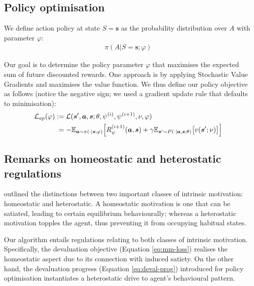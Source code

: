 \documentclass[utf8]{frontiersSCNS}
\newcommand{\bs}{\boldsymbol}
\begin{document}
\subsection{Policy optimisation} \label{subsec:policy}

We define action policy at state $S=\bs{s}$ as the probability distribution over $A$ with parameter $\varphi$:
%
	\begin{equation}
	\begin{aligned} \label{eq:policy}
	\pi(A|S=\bs{s}; \varphi)
	\end{aligned}
	\end{equation}

Our goal is to determine the policy parameter $\varphi$ that maximises the expected sum of future discounted rewards. One approach is by applying Stochastic Value Gradients \citep{svg} and maximises the value function. We thus define our policy objective as follows (notice the negative sign; we used a gradient update rule that defaults to minimisation):
%
	\begin{equation}
	\begin{aligned} \label{eq:policy-loss}
	\mathcal{L}_{ap}(\varphi) 
		&:=
		\mathcal{L}(\bs{s}^\prime, \bs{a}, \bs{s}; \theta, \psi^{(i)}, \psi^{(i+1)}, \nu, \varphi) \\
		&\phantom{:}= - 
		\mathbb{E}_{\bs{a} \sim \pi(\cdot | \bs{s}; \varphi)} 
		\Bigl[ 
		R_\psi^{(i+1)}(\bs{a}, \bs{s}) + \gamma 
		\mathbb{E}_{\bs{s}^\prime \sim P(\cdot |\bs{a}, \bs{s}; \theta)}
		\bigl[ v(\bs{s}^\prime; \nu) \bigr] 
		\Bigr] \\
	\end{aligned}
	\end{equation}

\subsection{Remarks on homeostatic and heterostatic regulations} \label{subsec:homeohetero}

\citet{intrinsicmotiv} outlined the distinctions between two important classes of intrinsic motivation: homeostatic and heterostatic. A homeostatic motivation is one that can be satiated, leading to certain equilibrium behaviourally; whereas a heterostatic motivation topples the agent, thus preventing it from occupying habitual states.

Our algorithm entails regulations relating to both classes of intrinsic motivation. Specifically, the devaluation objective (Equation \ref{eq:mm-loss}) realises the homeostatic aspect due to its connection with induced satiety. On the other hand, the devaluation progress (Equation \ref{eq:deval-prog}) introduced for policy optimisation instantiates a heterostatic drive to agent's behavioural pattern.
\end{document}

